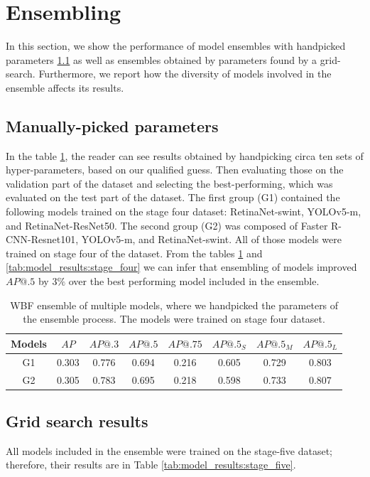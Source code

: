 \section{Ensembling}
\label{sec:ensembling_results}
In this section, we show the performance of model ensembles with handpicked parameters \ref{subsec:handpicked} as well as ensembles obtained by parameters found by a grid-search. Furthermore, we report how the diversity of models involved in the ensemble affects its results.
\subsection{Manually-picked parameters}
\label{subsec:handpicked}
In the table \ref{tab:model_ensembling:handpicked}, the reader can see results obtained by handpicking circa ten sets of hyper-parameters, based on our qualified guess. Then evaluating those on the validation part of the dataset and selecting the best-performing, which was evaluated on the test part of the dataset. The first group (G1) contained the following models trained on the stage four dataset: RetinaNet-swint, YOLOv5-m, and RetinaNet-ResNet50. The second group (G2) was composed of Faster R-CNN-Resnet101, YOLOv5-m, and RetinaNet-swint. All of those models were trained on stage four of the dataset. From the tables \ref{tab:model_ensembling:handpicked} and \ref{tab:model_results:stage_four} we can infer that ensembling of models improved $AP@.5$ by $3\%$ over the best performing model included in the ensemble.
\begin{table}[H]
    \begin{tabular}{|c|c|c|c|c|c|c|c|}
        \hline
        Models & $AP$  & $AP@.3$ & $AP@.5$ & $AP@.75$ & $AP@.5_S$ & $AP@.5_M$ & $AP@.5_L$ \\ \hline
        G1     & 0.303 & 0.776   & 0.694   & 0.216    & 0.605     & 0.729     & 0.803     \\ \hline
        G2     & 0.305 & 0.783   & 0.695   & 0.218    & 0.598     & 0.733     & 0.807     \\ \hline
    \end{tabular}
    \caption{WBF ensemble of multiple models, where we handpicked the parameters of the ensemble process. The models were trained on stage four dataset.}
    \label{tab:model_ensembling:handpicked}
\end{table}
\subsection{Grid search results}
\label{subsec:gridsearched}
All models included in the ensemble were trained on the stage-five dataset; therefore, their results are in Table \ref{tab:model_results:stage_five}.


